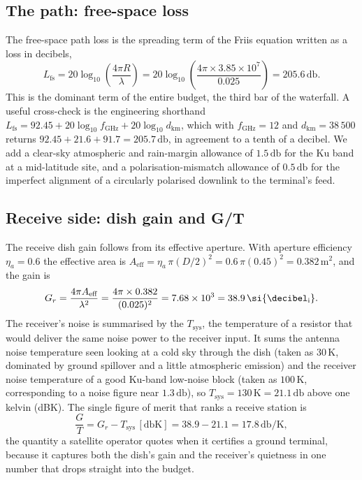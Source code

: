 \subsection{The path: free-space loss}

The free-space path loss is the spreading term of the Friis equation
written as a loss in decibels,
\[
L_{\text{fs}} = 20\log_{10}\!\left(\frac{4\pi R}{\lambda}\right) =
20\log_{10}\!\left(\frac{4\pi\times 3.85\times 10^{7}}{0.025}\right) =
205.6\,\si{\decibel}.
\]
This is the dominant term of the entire budget, the third bar of the
waterfall. A useful cross-check is the engineering shorthand
$L_{\text{fs}} = 92.45 + 20\log_{10}f_{\text{GHz}} + 20\log_{10}
d_{\text{km}}$, which with $f_{\text{GHz}} = 12$ and $d_{\text{km}} =
38\,500$ returns $92.45 + 21.6 + 91.7 = 205.7\,\si{\decibel}$, in
agreement to a tenth of a decibel. We add a clear-sky atmospheric and
rain-margin allowance of $1.5\,\si{\decibel}$ for the Ku band at a
mid-latitude site, and a polarisation-mismatch allowance of
$0.5\,\si{\decibel}$ for the imperfect alignment of a circularly polarised
downlink to the terminal's feed.

\subsection{Receive side: dish gain and G/T}

The receive dish gain follows from its effective aperture. With aperture
efficiency $\eta_{a} = 0.6$ the effective area is $A_{\text{eff}} =
\eta_{a}\,\pi (D/2)^{2} = 0.6\,\pi(0.45)^{2} = 0.382\,\si{\meter}^{2}$,
and the gain is
\[
G_{r} = \frac{4\pi A_{\text{eff}}}{\lambda^{2}} = \frac{4\pi\times 0.382}
{(0.025)^{2}} = 7.68\times 10^{3} = 38.9\,\si{\decibel\textsubscript{i}}.
\]
The receiver's noise is summarised by the  $T_{\text{sys}}$, the temperature of a resistor that would
deliver the same noise power to the receiver input. It sums the antenna
noise temperature seen looking at a cold sky through the dish (taken as
$30\,\si{\kelvin}$, dominated by ground spillover and a little
atmospheric emission) and the receiver noise temperature of a good Ku-band
low-noise block (taken as $100\,\si{\kelvin}$, corresponding to a noise
figure near $1.3\,\si{\decibel}$), so $T_{\text{sys}} = 130\,\si{\kelvin}
= 21.1\,\si{\decibel}$ above one kelvin (dBK). The single figure of merit
that ranks a receive station is
\[
\frac{G}{T} = G_{r} - T_{\text{sys}}\,[\si{\decibel}\text{K}] = 38.9 -
21.1 = 17.8\,\si{\decibel}\text{/K},
\]
the quantity a satellite operator quotes when it certifies a ground
terminal, because it captures both the dish's gain and the receiver's
quietness in one number that drops straight into the budget.

